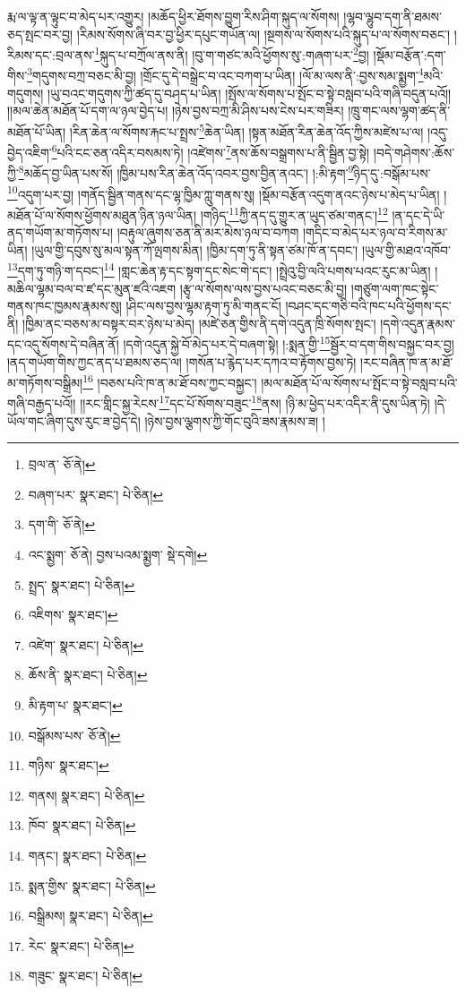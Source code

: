 རྨ་ལ་ལྟ་ན་ལྟུང་བ་མེད་པར་འགྱུར། །མཆོད་ཕྱིར་ཐོགས་བྱུག་རིས་ཤིག་སྐུད་ལ་སོགས། །ལྷབ་ལྷུབ་དག་ནི་ཐམས་ཅད་སྤང་བར་བྱ། །རིམས་སོགས་ཞི་བར་བྱ་ཕྱིར་དཔུང་གཡོན་ལ། །སྔགས་ལ་སོགས་པའི་སྐུད་པ་ལ་སོགས་བཅང་། །རིམས་དང་:བྲལ་ནས་\footnote{བྲལ་ན་  ཅོ་ནེ། }སྐུད་པ་བཀྲོལ་ནས་ནི། །བུ་ག་གཙང་མའི་ཕྱོགས་སུ་:གཞག་པར་\footnote{བཞག་པར་  སྣར་ཐང་།  པེ་ཅིན། }བྱ། །སྡོམ་བརྩོན་:དག་གིས་\footnote{དག་གི་  ཅོ་ནེ། }གདུགས་བཀྲ་བཅང་མི་བྱ། །གྲོང་དུ་དེ་བསྒྲེང་བ་འང་བཀག་པ་ཡིན། །ལོ་མ་ལས་ནི་:བྱས་སམ་སྨྱག་\footnote{འང་སྨྱག་  ཅོ་ནེ། བྱས་པའམ་སྨྱག་  སྡེ་དགེ། }མའི་གདུགས། །ཡུ་བའང་གདུགས་ཀྱི་ཚད་དུ་བཤད་པ་ཡིན། །སྤོས་ལ་སོགས་པ་སྤོང་བ་སྟེ་བསླབ་པའི་གཞི་བདུན་པའོ།། །།མལ་ཆེན་མཐོན་པོ་དག་ལ་ཉལ་བྱེད་པ། །ཉེས་བྱས་བཀྲ་མི་ཤིས་པས་ངེས་པར་གཟིར། །ཁྲུ་གང་ལས་ལྷག་ཚད་ནི་མཐོན་པོ་ཡིན། །རིན་ཆེན་ལ་སོགས་རྐང་པ་སྤྲས་\footnote{སྤྲད་  སྣར་ཐང་།  པེ་ཅིན། }ཆེན་ཡིན། །སྟན་མཐོན་རིན་ཆེན་འོད་ཀྱིས་མཛེས་པ་ལ། །འདུ་བྱེད་འཇིག་\footnote{འཇིགས་  སྣར་ཐང་། }པའི་ངང་ཅན་འདིར་བསམས་ཏེ། །འཛེགས་\footnote{འཛེག་  སྣར་ཐང་།  པེ་ཅིན། }ནས་ཆོས་བསྒྲགས་པ་ནི་སྦྱིན་བྱ་སྟེ། །བདེ་གཤེགས་:ཆོས་ཀྱི་\footnote{ཆོས་ནི་  སྣར་ཐང་།  པེ་ཅིན། }མཆོད་བྱ་ཡིན་པས་སོ། །ཁྱིམ་པས་རིན་ཆེན་འོད་འབར་བྱས་བྱིན་ནའང་། །:མི་རྟག་\footnote{མི་རྟག་པ་  སྣར་ཐང་། }ཉིད་དུ་:བསྒོམ་པས་\footnote{བསྒོམས་པས་  ཅོ་ནེ། }འདུག་པར་བྱ། །གནོད་སྦྱིན་གནས་དང་ལྷ་ཁྱིམ་ཀླུ་གནས་སུ། །སྡོམ་བརྩོན་འདུག་ནའང་ཉེས་པ་མེད་པ་ཡིན། །མཐོན་པོ་ལ་སོགས་ཕྱོགས་མཐུན་ཉིན་ཉལ་ཡིན། །གཉིད་\footnote{གཉིས་  སྣར་ཐང་། }ཀྱི་ནད་དུ་གྱུར་ན་ཡུད་ཙམ་གནང་།\footnote{གནས།  སྣར་ཐང་།  པེ་ཅིན། } །ན་དང་དེ་ཡི་ནད་གཡོག་མ་གཏོགས་པ། །བརྟུལ་ཞུགས་ཅན་ནི་མར་མེས་ཉལ་བ་བཀག །གདིང་བ་མེད་པར་ཉལ་བ་རིགས་མ་ཡིན། །ཡུལ་གྱི་དབུས་སུ་མལ་སྟན་ཀོ་ལྤགས་མིན། །ཁྱིམ་དག་ཏུ་ནི་སྟན་ཙམ་ཁོ་ན་དབང་། །ཡུལ་གྱི་མཐའ་འཁོབ་\footnote{ཁོབ་  སྣར་ཐང་།  པེ་ཅིན། }དག་ཏུ་གཉི་ག་དབང་།\footnote{གནང་།  སྣར་ཐང་།  པེ་ཅིན། } །གླང་ཆེན་རྟ་དང་སྟག་དང་སེང་གེ་དང་། །སྤྲེའུ་བྱི་ལའི་པགས་པའང་རུང་མ་ཡིན། །མཆིལ་ལྷམ་བལ་བ་ཛ་དང་མུན་ཛའི་འཇག །རྩྭ་ལ་སོགས་ལས་བྱས་པའང་བཅང་མི་བྱ། །གཙུག་ལག་ཁང་སྟེང་གནས་ཁང་ཁྱམས་རྣམས་སུ། །ཤིང་ལས་བྱས་ལྷམ་རྟག་ཏུ་མི་གནང་ངོ། །བཤང་དང་གཅི་བའི་ཁང་པའི་ཕྱོགས་དང་ནི། །ཁྱིམ་ནང་བཅས་མ་བསྟར་བར་ཉེས་པ་མེད། །མཛེ་ཅན་གྱིས་ནི་དགེ་འདུན་ཁྲི་སོགས་སྤང་། །དགེ་འདུན་རྣམས་དང་འདུ་སོགས་དེ་བཞིན་ནོ། །དགེ་འདུན་སྐྱེ་བོ་མེད་པར་དེ་བཞག་སྟེ། །:སྨན་གྱི་\footnote{སྨན་གྱིས་  སྣར་ཐང་།  པེ་ཅིན། }སྦྱོར་བ་དག་གིས་བསྐྱང་བར་བྱ། །ནད་གཡོག་གིས་ཀྱང་ནད་པ་ཐམས་ཅད་ལ། །གསོན་པ་རྙེད་པར་དཀའ་བ་རྟོགས་བྱས་ཏེ། །རང་བཞིན་ཁ་ན་མ་ཐོ་མ་གཏོགས་བསྒྲིམ།\footnote{བསྒྲིམས།  སྣར་ཐང་།  པེ་ཅིན། } །བཅས་པའི་ཁ་ན་མ་ཐོ་བས་ཀྱང་བསྐྱང་། །མལ་མཐོན་པོ་ལ་སོགས་པ་སྤོང་བ་སྟེ་བསླབ་པའི་གཞི་བརྒྱད་པའོ།། །།རང་གླིང་སྐྱ་རེངས་\footnote{རེང་  སྣར་ཐང་།  པེ་ཅིན། }དང་པོ་སོགས་བཟུང་\footnote{གཟུང་  སྣར་ཐང་།  པེ་ཅིན། }ནས། །ཉི་མ་ཕྱེད་པར་འདིར་ནི་དུས་ཡིན་ཏེ། །དེ་ཡོལ་གང་ཞིག་དུས་རུང་ཟ་བྱེད་དེ། །ཉེས་བྱས་ལྕགས་ཀྱི་གོང་བུའི་ཟས་རྣམས་ཟ། །
